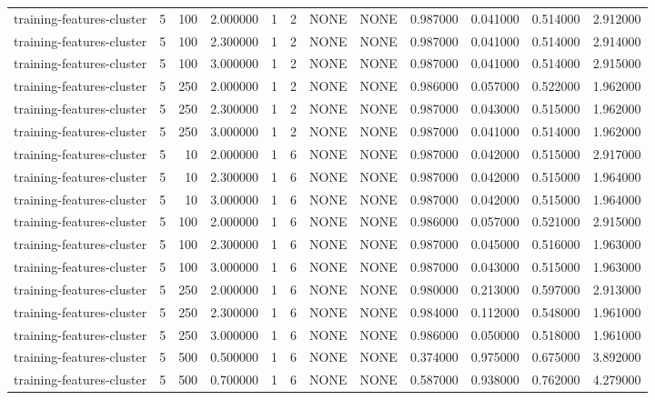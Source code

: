 \begin{tabular}{lrrrllllrrrr}
training-features-cluster & 5 & 100 & 2.000000 & 1 & 2 & NONE & NONE & 0.987000 & 0.041000 & 0.514000 & 2.912000 \\
training-features-cluster & 5 & 100 & 2.300000 & 1 & 2 & NONE & NONE & 0.987000 & 0.041000 & 0.514000 & 2.914000 \\
training-features-cluster & 5 & 100 & 3.000000 & 1 & 2 & NONE & NONE & 0.987000 & 0.041000 & 0.514000 & 2.915000 \\
training-features-cluster & 5 & 250 & 2.000000 & 1 & 2 & NONE & NONE & 0.986000 & 0.057000 & 0.522000 & 1.962000 \\
training-features-cluster & 5 & 250 & 2.300000 & 1 & 2 & NONE & NONE & 0.987000 & 0.043000 & 0.515000 & 1.962000 \\
training-features-cluster & 5 & 250 & 3.000000 & 1 & 2 & NONE & NONE & 0.987000 & 0.041000 & 0.514000 & 1.962000 \\
training-features-cluster & 5 & 10 & 2.000000 & 1 & 6 & NONE & NONE & 0.987000 & 0.042000 & 0.515000 & 2.917000 \\
training-features-cluster & 5 & 10 & 2.300000 & 1 & 6 & NONE & NONE & 0.987000 & 0.042000 & 0.515000 & 1.964000 \\
training-features-cluster & 5 & 10 & 3.000000 & 1 & 6 & NONE & NONE & 0.987000 & 0.042000 & 0.515000 & 1.964000 \\
training-features-cluster & 5 & 100 & 2.000000 & 1 & 6 & NONE & NONE & 0.986000 & 0.057000 & 0.521000 & 2.915000 \\
training-features-cluster & 5 & 100 & 2.300000 & 1 & 6 & NONE & NONE & 0.987000 & 0.045000 & 0.516000 & 1.963000 \\
training-features-cluster & 5 & 100 & 3.000000 & 1 & 6 & NONE & NONE & 0.987000 & 0.043000 & 0.515000 & 1.963000 \\
training-features-cluster & 5 & 250 & 2.000000 & 1 & 6 & NONE & NONE & 0.980000 & 0.213000 & 0.597000 & 2.913000 \\
training-features-cluster & 5 & 250 & 2.300000 & 1 & 6 & NONE & NONE & 0.984000 & 0.112000 & 0.548000 & 1.961000 \\
training-features-cluster & 5 & 250 & 3.000000 & 1 & 6 & NONE & NONE & 0.986000 & 0.050000 & 0.518000 & 1.961000 \\
training-features-cluster & 5 & 500 & 0.500000 & 1 & 6 & NONE & NONE & 0.374000 & 0.975000 & 0.675000 & 3.892000 \\
training-features-cluster & 5 & 500 & 0.700000 & 1 & 6 & NONE & NONE & 0.587000 & 0.938000 & 0.762000 & 4.279000 \\

\end{tabular}
